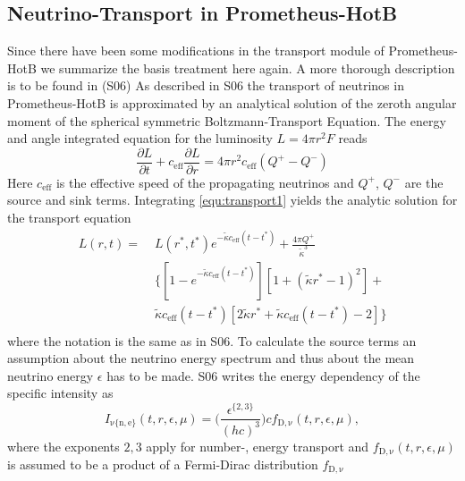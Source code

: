 \documentclass[fleqn,usenatbib]{mnras}
\begin{document}
\begin{appendices}
 \section{Neutrino-Transport in Prometheus-HotB}
  \label{Appendix:Neutrino}
   Since there have been some modifications in the transport module of Prometheus-HotB we summarize the basis treatment here again. A more thorough description is to be found in \cite{ScheckEtAl2006} (S06)
  As described in S06 the transport of neutrinos in Prometheus-HotB is approximated by an analytical solution of the zeroth angular moment of the spherical symmetric Boltzmann-Transport Equation. The energy and angle integrated equation for the luminosity $L=4\pi r^2 F$ reads
 \begin{equation}
  \label{equ:transport1}
  \frac{\partial L}{\partial t} + c_{\mathrm{eff}} \frac{\partial L }{\partial r} = 4 \pi r^2 c_{\mathrm{eff}} (Q^+ - Q^-)
 \end{equation}
 Here $c_{\mathrm{eff}}$ is the effective speed of the propagating neutrinos and $Q^+$, $Q^-$ are the source and sink terms.
 Integrating \ref{equ:transport1} yields the analytic solution for the transport equation
 \begin{equation}
  \begin{split}
    L(r,t) = \; & L(r^*,t^{*}) e^{- \tilde{\kappa} c_{\mathrm{eff}} (t-t^{*}) } + \frac{4\pi Q^{+}}{\tilde{\kappa}^3}\\
    & \Big\{ [ 1 - e^{-\tilde{\kappa} c_{\mathrm{eff}} (t-t^{*} )} ] [ 1 + (\tilde{\kappa}r^{*} -1)^2 ] + \\
    & \tilde{\kappa} c_{\mathrm{eff}} (t - t^{*} ) [ 2 \tilde{\kappa} r^{*} + \tilde{\kappa} c_{\mathrm{eff}} (t-t^{*}) - 2 ] \Big\}\\
 \end{split}
 \end{equation}
 where the notation is the same as in S06.
 To calculate the source terms an assumption about the neutrino energy spectrum and thus about the mean neutrino energy $\epsilon$ has to be made. S06 writes the energy dependency of the specific intensity as
  \begin{equation}
  \label{equ:intensity}
  I_{\mathrm{\nu\{n,e\}}}(t,r,\epsilon,\mu) = \Big(\frac{\epsilon^{\{2,3\}}}{(hc)^3} \Big) c f_{\mathrm{D,\nu}}(t, r, \epsilon, \mu),
 \end{equation}
 where the exponents $2,3$ apply for number-, energy transport and $f_{\mathrm{D,\nu}}(t, r, \epsilon, \mu)$ is assumed to be a product of a Fermi-Dirac distribution $f_{\mathrm{D,\nu}}$

\end{appendices}
\end{document}
